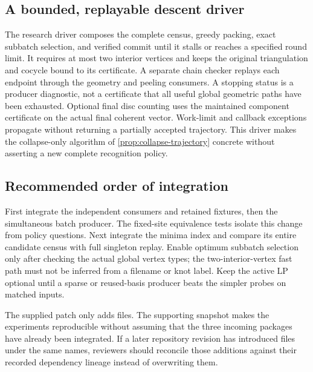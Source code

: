 \subsection{A bounded, replayable descent driver}

The research driver composes the complete census, greedy packing, exact
subbatch selection, and verified commit until it stalls or reaches a
specified round limit. It requires at most two interior vertices and
keeps the original triangulation and cocycle bound to its certificate.
A separate chain checker replays each endpoint through the geometry and
peeling consumers. A stopping status is a producer diagnostic, not a
certificate that all useful global geometric paths have been exhausted.
Optional final disc counting uses the maintained component certificate on
the actual final coherent vector. Work-limit and callback exceptions
propagate without returning a partially accepted trajectory. This driver
makes the collapse-only algorithm of \cref{prop:collapse-trajectory}
concrete without asserting a new complete recognition policy.

\subsection{Recommended order of integration}

First integrate the independent consumers and retained fixtures, then the
simultaneous batch producer. The fixed-site equivalence tests isolate this
change from policy questions. Next integrate the minima index and compare
its entire candidate census with full singleton replay. Enable optimum
subbatch selection only after checking the actual global vertex types; the
two-interior-vertex fast path must not be inferred from a filename or knot
label. Keep the active LP optional until a sparse or reused-basis producer
beats the simpler probes on matched inputs.

The supplied patch only adds files. The supporting snapshot makes the
experiments reproducible without assuming that the three incoming packages
have already been integrated. If a later repository revision has introduced
files under the same names, reviewers should reconcile those additions
against their recorded dependency lineage instead of overwriting them.


